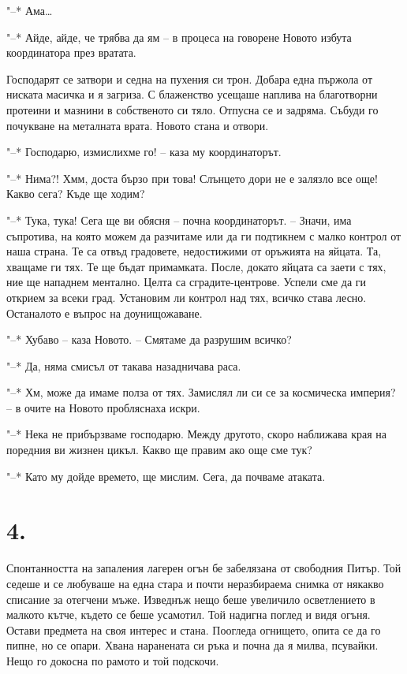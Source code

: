 \documentclass[ebook,openany,12pt]{memoir}
\begin{document}
"--* Ама\ldots

"--* Айде, айде, че трябва да ям – в процеса на говорене Новото избута координатора през вратата.

Господарят се затвори и седна на пухения си трон. Добара една пържола от ниската масичка и я загриза. С блаженство усещаше наплива на благотворни протеини и мазнини в собственото си тяло. Отпусна се и задряма. Събуди го почукване на металната врата. Новото стана и отвори.

"--* Господарю, измислихме го! – каза му координаторът.

"--* Нима?! Хмм, доста бързо при това! Слънцето дори не е залязло все още! Какво сега? Къде ще ходим?

"--* Тука, тука! Сега ще ви обясня – почна координаторът. – Значи, има съпротива, на която можем да разчитаме или да ги подтикнем с малко контрол от наша страна. Те са отвъд градовете, недостижими от оръжията на яйцата. Та, хващаме ги тях. Те ще бъдат примамката. После, докато яйцата са заети с тях, ние ще нападнем ментално. Целта са сградите-центрове. Успели сме да ги открием за всеки град. Установим ли контрол над тях, всичко става лесно. Останалото е въпрос на доунищожаване.

"--* Хубаво – каза Новото. – Смятаме да разрушим всичко?

"--* Да, няма смисъл от такава назадничава раса.

"--* Хм, може да имаме полза от тях. Замислял ли си се за космическа империя? – в очите на Новото пробляснаха искри.

"--* Нека не прибързваме господарю. Между другото, скоро наближава края на поредния ви жизнен цикъл. Какво ще правим ако още сме тук?

"--* Като му дойде времето, ще мислим. Сега, да почваме атаката.

\section*{4.}

Спонтанността на запаления лагерен огън бе забелязана от свободния Питър. Той седеше и се любуваше на една стара и почти неразбираема снимка от някакво списание за отегчени мъже. Изведнъж нещо беше увеличило осветлението в малкото кътче, където се беше усамотил. Той надигна поглед и видя огъня. Остави предмета на своя интерес и стана. Поогледа огнището, опита се да го пипне, но се опари. Хвана наранената си ръка и почна да я милва, псувайки. Нещо го докосна по рамото и той подскочи.
\end{document}
